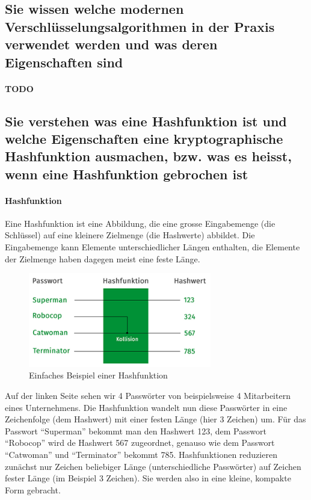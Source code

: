 \documentclass[10pt,a4paper]{article}
\begin{document}
\subsection*{Sie wissen welche modernen Verschlüsselungsalgorithmen in der Praxis verwendet werden und was deren Eigenschaften sind}
\paragraph*{TODO}


\subsection*{Sie verstehen was eine Hashfunktion ist und welche Eigenschaften eine kryptographische Hashfunktion ausmachen, bzw. was es heisst, wenn eine Hashfunktion gebrochen ist}

\paragraph*{Hashfunktion}\label{para:Hashfunktion}Eine Hashfunktion ist eine Abbildung, die eine grosse Eingabemenge (die Schlüssel) auf eine kleinere Zielmenge (die Hashwerte) abbildet. Die Eingabemenge kann Elemente unterschiedlicher Längen enthalten, die Elemente der Zielmenge haben dagegen meist eine feste Länge.
\begin{figure}[H]
    \begin{center}
    \includegraphics[width=8cm]{images/hash1.png}
    \caption{Einfaches Beispiel einer Hashfunktion}
    \label{hash1}
    \end{center}
\end{figure}

\noindent
Auf der linken Seite sehen wir 4 Passwörter von beispielsweise 4 Mitarbeitern eines Unternehmens. Die Hashfunktion  wandelt nun diese Passwörter in eine Zeichenfolge (dem Hashwert) mit einer festen Länge (hier 3 Zeichen) um. Für das Passwort "`Superman"' bekommt man den Hashwert 123, dem Passwort "`Robocop"' wird de Hashwert 567 zugeordnet, genauso wie dem Passwort "`Catwoman"' und "`Terminator"' bekommt 785.
Hashfunktionen reduzieren zunächst nur Zeichen beliebiger Länge (unterschiedliche Passwörter) auf Zeichen fester Länge (im Beispiel 3 Zeichen). Sie werden also in eine kleine, kompakte Form gebracht.
\end{document}
